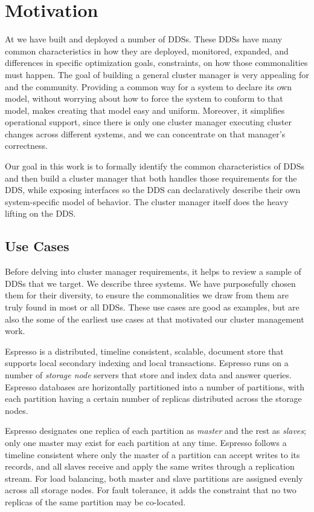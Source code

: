 \section{Motivation}
\label{sec:motivation}
%
At \linkedin we have built and deployed a number of DDSs.
These DDSs have many common characteristics in how
they are deployed, monitored, expanded, \etc and differences in specific optimization goals,
constraints, \etc on how those commonalities must happen.
The goal of building a general cluster manager is very appealing for \linkedin and the community.  
Providing a common way for a system to declare 
its own model, without worrying about how to force the system to conform to that model, makes creating 
that model easy and uniform.  Moreover, it simplifies operational support, since there is only one 
cluster manager executing cluster changes across different systems, and we can concentrate on that 
manager's correctness.

  Our goal in this work is to 
formally identify the common characteristics of DDSs and then build a cluster manager that 
both handles those requirements for the DDS, while exposing interfaces so the DDS can declaratively
describe their own system-specific model of behavior.  The cluster manager
itself does the heavy lifting on the DDS. 

 

\subsection{Use Cases}
\label{sec:usecases}
%
Before delving into cluster manager requirements, it helps to review a sample of DDSs that we 
target.  We describe three \linkedin systems.  We have purposefully chosen them for their diversity,
to ensure the commonalities we draw from them are truly found in most or all DDSs.  These use cases
are good as examples, but are also the some of the earliest use cases at \linkedin that motivated our 
cluster management work.

Espresso is a distributed, timeline consistent, scalable, document store that 
supports local secondary indexing and local transactions.  Espresso runs on a 
number of \emph{storage node} servers that store and index data and 
answer queries. Espresso databases are horizontally partitioned into a number of partitions, 
with each partition having a certain number of replicas distributed across the 
storage nodes.

Espresso designates one replica of each partition as \emph{master} and the rest as \emph{slaves}; only
one master may exist for each partition at any time.  
Espresso follows a timeline consistent where only the master of a partition can accept writes to its records, and 
all slaves receive and apply the same writes through a replication stream.  For load balancing, both master and slave
partitions are assigned evenly across all storage nodes.  For fault tolerance, it adds the constraint that no   
two replicas of the same partition may be co-located.

